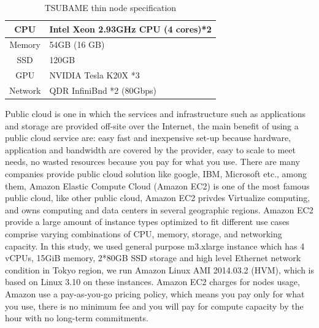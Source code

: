 \begin{table}[h]
\caption{\small TSUBAME thin node specification}
\label{tbl:spec}
\begin{center}
\begin{tabular}{|c|l|}
  \hline
  \cellcolor{lightgray} CPU      & Intel Xeon 2.93GHz CPU (4 cores)*2\\
  \hline
  \cellcolor{lightgray} Memory   & 54GB (16 GB)    \\
  \hline
  \cellcolor{lightgray} SSD      & 120GB \\
  \hline
  \cellcolor{lightgray} GPU	 & NVIDIA Tesla K20X *3\\
  \hline
  \cellcolor{lightgray} Network  & QDR InfiniBnd *2 (80Gbps)\\
  \hline
\end{tabular}
\end{center}
\end{table}

Public cloud is one in which the services and infrastructure such as applications and storage are provided off-site over the Internet, the main benefit of using a public cloud service are: easy fast and inexpensive set-up because hardware, application and bandwidth are covered by the provider, easy to scale to meet needs, no wasted resources because you pay for what you use.
There are many companies provide public cloud solution like google, IBM, Microsoft etc., among them, Amazon Elastic Compute Cloud (Amazon EC2)\cite{AMAZON_AWS} is one of the most famous public cloud, like other public cloud, Amazon EC2 privdes Virtualize computing, and owns computing and data centers in several geographic regions.
Amazon EC2 provide a large amount of instance types optimized to fit different use cases comprise varying combinations of CPU, memory, storage, and networking capacity.
In this study, we used general purpose m3.xlarge instance which has 4 vCPUs, 15GiB memory, 2*80GB SSD storage and high level Ethernet network condition in Tokyo region, we run Amazon Linux AMI 2014.03.2 (HVM), which is based on Linux 3.10 on these instances.
Amazon EC2 charges for nodes usage, Amazon use a pay-as-you-go pricing policy\cite{AMAZON_AWS}, which means you pay only for what you use, there is no minimum fee and you will pay for compute capacity by the hour with no long-term commitments.
